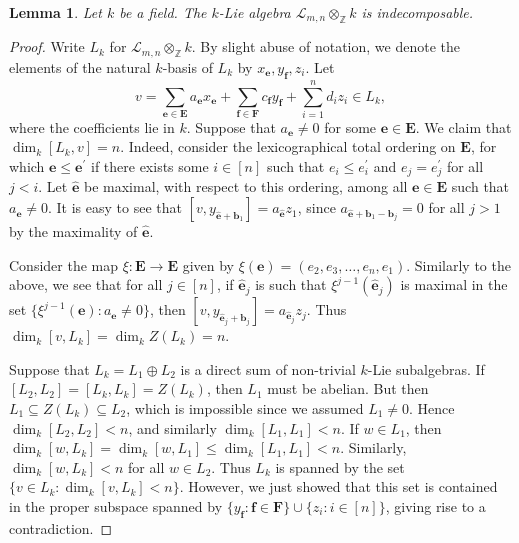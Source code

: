 \documentclass[11pt,a4paper]{amsart}
\theoremstyle{plain}
\newtheorem{lemma}[thm]{Lemma}
\theoremstyle{remark}
\newcommand{\Z}{\mathbb{Z}}
\newcommand{\tensor}{\otimes}
\begin{document}
\begin{lemma} \label{lem:bko.abs.indec}
Let $k$ be a field.  The $k$-Lie algebra $\mathcal{L}_{m,n} \tensor_{\Z} k$ is indecomposable.
\end{lemma}
\begin{proof}
Write $L_k$ for $\mathcal{L}_{m,n} \tensor_{\Z} k$.  By slight abuse of notation, we denote the elements of the natural $k$-basis of $L_k$ by $x_{\mathbf{e}}, y_{\mathbf{f}}, z_i$.  Let
$$ v = \sum_{\mathbf{e} \in \mathbf{E}} a_{\mathbf{e}} x_{\mathbf{e}} + \sum_{\mathbf{f} \in \mathbf{F}} c_{\mathbf{f}} y_{\mathbf{f}} + \sum_{i = 1}^n d_i z_i \in L_k,$$
where the coefficients lie in $k$.
Suppose that $a_{\mathbf{e}} \neq 0$ for some $\mathbf{e} \in \mathbf{E}$.  We claim that $\dim_k [L_k, v] = n$.  Indeed, consider the lexicographical total ordering on $\mathbf{E}$, for which $\mathbf{e} \leq \mathbf{e}^\prime$ if there exists some $i \in [n]$ such that $e_i \leq e^\prime_i$ and $e_j = e^\prime_j$ for all $j < i$.  Let $\widehat{\mathbf{e}}$ be maximal, with respect to this ordering, among all $\mathbf{e} \in \mathbf{E}$ such that $a_{\mathbf{e}} \neq 0$.  It is easy to see that $[v, y_{\widehat{\mathbf{e}} + \mathbf{b}_1}] = a_{\widehat{\mathbf{e}}} z_1$, since $a_{\widehat{\mathbf{e}} + \mathbf{b}_1 - \mathbf{b}_j} = 0$ for all $j > 1$ by the maximality of $\widehat{\mathbf{e}}$.

Consider the map $\xi : \mathbf{E} \to \mathbf{E}$ given by $\xi(\mathbf{e}) = (e_2, e_3, \dots, e_n, e_1)$.  Similarly to the above, we see that for all $j \in [n]$, if $\widehat{\mathbf{e}}_j$ is such that $\xi^{j-1}(\widehat{\mathbf{e}}_j)$ is maximal in the set $\{ \xi^{j-1}(\mathbf{e}) : a_{\mathbf{e}} \neq 0 \}$, then $[v, y_{\widehat{\mathbf{e}}_j + \mathbf{b}_j}] = a_{\widehat{\mathbf{e}}_j} z_j$.  Thus $\dim_k [v, L_k] = \dim_k Z(L_k) = n$.

Suppose that $L_k = L_1 \oplus L_2$ is a direct sum of non-trivial $k$-Lie subalgebras.  If $[L_2, L_2] = [L_k, L_k] = Z(L_k)$, then $L_1$ must be abelian.  But then $L_1 \subseteq Z(L_k) \subseteq L_2$, which is impossible since we assumed $L_1 \neq 0$.  Hence $\dim_k [L_2, L_2] < n$, and similarly $\dim_k [L_1, L_1] < n$.
If $w \in L_1$, then $\dim_k [w, L_k] = \dim_k [w, L_1] \leq \dim_k [L_1, L_1] < n$.  Similarly, $\dim_k [w, L_k] < n$ for all $w \in L_2$.  Thus $L_k$ is spanned by the set $\{ v \in L_k : \dim_k [v, L_k] < n \}$.  However, we just showed that this set is contained in the proper subspace spanned by $\{ y_{\mathbf{f}} : \mathbf{f} \in \mathbf{F} \} \cup \{ z_i : i \in [n] \}$, giving rise to a contradiction.
\end{proof}
\end{document}
